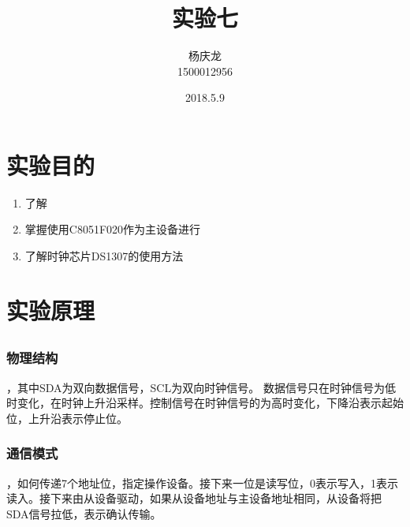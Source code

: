 \documentclass{article}
\newcommand{\ifc}{$I^2C$}
\begin{document}

\begin{CJK}{UTF8}{gkai}
\title{实验七 }
\author{杨庆龙 \\1500012956}
\date{2018.5.9}
\maketitle

\section{实验目的}
\begin{enumerate}
  \item 了解
  \item 掌握使用C8051F020作为主设备进行
  \item 了解时钟芯片DS1307的使用方法
\end{enumerate}

\section{实验原理}
\subsection{}
\subsubsection{物理结构}
，其中SDA为双向数据信号，SCL为双向时钟信号。
数据信号只在时钟信号为低时变化，在时钟上升沿采样。控制信号在时钟信号的为高时变化，下降沿表示起始位，上升沿表示停止位。
\subsubsection{通信模式}
，如何传递7个地址位，指定操作设备。接下来一位是读写位，0表示写入，1表示读入。接下来由从设备驱动，如果从设备地址与主设备地址相同，从设备将把SDA信号拉低，表示确认传输。

\end{CJK}
\end{document}
